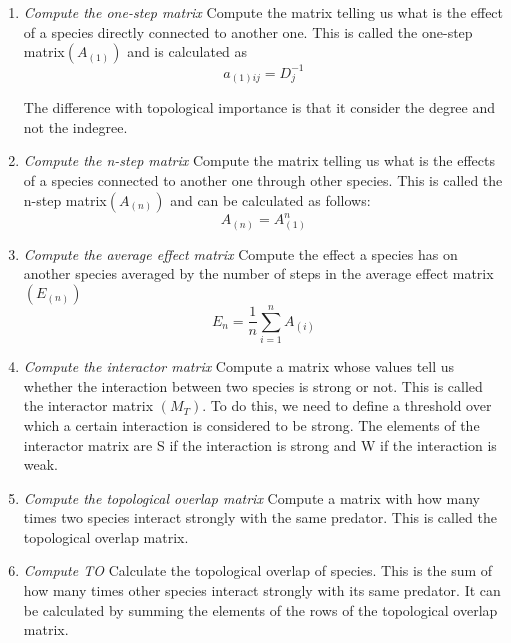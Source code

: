 \documentclass[twocolumn]{article}
\begin{document}
        \begin{enumerate}
            \item \emph{Compute the one-step matrix} \smallskip \newline 
            Compute the matrix telling us what is the effect of a species directly connected to another one. This is called the one-step matrix$ (A_{(1)}) $ and is calculated as 
            $$a_{(1)ij}=D_j^{-1}$$
            \par The difference with topological importance is that it consider the degree and not the indegree. 
            \item \emph{Compute the n-step matrix} \smallskip \newline 
            Compute the matrix telling us what is the effects of a species connected to another one through other species. This is called the n-step matrix$ (A_{(n)}) $ and can be calculated as follows: $$A_{(n)}=A_{(1)}^n$$
            \item \emph{Compute the average effect matrix} \smallskip \newline
            Compute the effect a species has on another species averaged by the number of steps in the average effect matrix $(E_{(n)})$
            \begin{equation}
                E_n=\frac{1}{n}\sum\limits^n_{i=1}A_{(i)}
            \end{equation}
            \item \emph{Compute the interactor matrix} \smallskip \newline 
            Compute a matrix whose values tell us whether the interaction between two species is strong or not. This is called the interactor matrix $ (M_T) $. To do this, we need to define a threshold over which a certain interaction is considered to be strong. The elements of the interactor matrix are S if the interaction is strong and W if the interaction is weak. 
            \item \emph{Compute the topological overlap matrix} \smallskip \newline 
            Compute a matrix with how many times two species interact strongly with the same predator. This is called the topological overlap matrix.
            \item \emph{Compute TO} \smallskip \newline 
            Calculate the topological overlap of species. This is the sum of how many times other species interact strongly with its same predator. It can be calculated by summing the elements of the rows of the topological overlap matrix.
        \end{enumerate}
\end{document}
